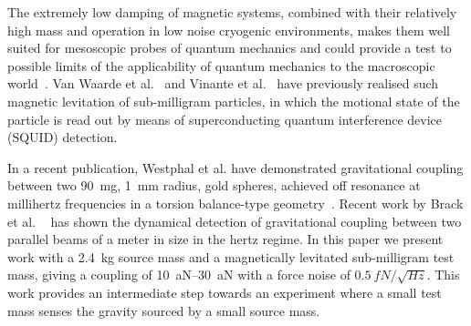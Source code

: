 The extremely low damping of magnetic systems, combined with their relatively high mass and operation in low noise cryogenic environments, makes them well suited for mesoscopic probes of quantum mechanics and could provide a test to possible limits of the applicability of quantum mechanics to the macroscopic world~\cite{leggett2002,arndt2014}.
Van Waarde et al.~\cite{Waarde2016} and Vinante et al.~\cite{vinante2020} have previously realised such magnetic levitation of sub-milligram particles, in which the motional state of the particle is read out by means of superconducting quantum interference device (SQUID) detection.




In a recent publication, Westphal et al. have demonstrated gravitational coupling between two \SI{90}{mg}, \SI{1}{mm} radius, gold spheres, achieved off resonance at millihertz frequencies in a torsion balance-type geometry~\cite{aspelmeyer2021}. Recent work by Brack et al. ~\cite{brack2022} has shown the dynamical detection of gravitational coupling between two parallel beams of a  meter in size in the hertz regime. In this paper we present work with a \SI{2.4}{kg} source mass and a magnetically levitated sub-milligram test mass, giving a coupling of \SIrange{10}{30}{aN} with a force noise of $\SI{0.5}{fN/\sqrt{Hz}}$. This work provides an intermediate step towards an experiment where a small test mass senses the gravity sourced by a small source mass.